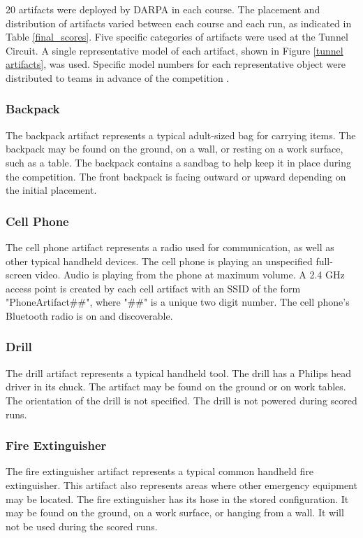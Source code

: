 20 artifacts were deployed by DARPA in each course. The placement and distribution of artifacts varied between each course and each run, as indicated in Table \ref{final_scores}. Five specific categories of artifacts were used at the Tunnel Circuit. A single representative model of each artifact, shown in Figure \ref{tunnel artifacts}, was used. Specific model numbers for each representative object were distributed to teams in advance of the competition \cite{tunnel_artifacts}.

\subsubsection{Backpack}

The backpack artifact represents a typical adult-sized bag for carrying items. The backpack may be found on the ground, on a wall, or resting on a work surface, such as a table. The backpack contains a sandbag to help keep it in place during the competition. The front backpack is facing outward or upward depending on the initial placement.

\subsubsection{Cell Phone}

The cell phone artifact represents a radio used for communication, as well as other typical handheld devices. The cell phone is playing an unspecified full-screen video. Audio is playing from the phone at maximum volume. A 2.4 GHz access point is created by each cell artifact with an SSID of the form "PhoneArtifact\#\#", where "\#\#" is a unique two digit number. The cell phone's Bluetooth radio is on and discoverable.

\subsubsection{Drill}

The drill artifact represents a typical handheld tool. The drill has a Philips head driver in its chuck. The artifact may be found on the ground or on work tables. The orientation of the drill is not specified. The drill is not powered during scored runs.

\subsubsection{Fire Extinguisher}

The fire extinguisher artifact represents a typical common handheld fire extinguisher. This artifact also represents areas where other emergency equipment may be located. The fire extinguisher has its hose in the stored configuration. It may be found on the ground, on a work surface, or hanging from a wall. It will not be used during the scored runs.

